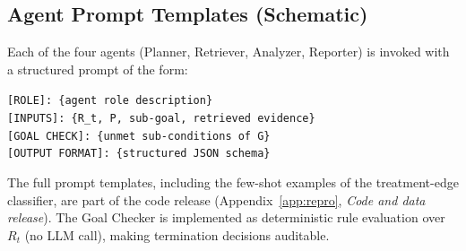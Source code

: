 \begin{table}[h]
\centering
\caption{VIGIL goal-predicate and loop hyperparameters used throughout the evaluation.}
\label{tab:hyperparams}
\small
\setlength{\tabcolsep}{4pt}
\end{table}

\subsection{Agent Prompt Templates (Schematic)}

Each of the four agents (Planner, Retriever, Analyzer, Reporter) is invoked with a structured prompt of the form:
\begin{mycodebox}
\small\texttt{[ROLE]: \{agent role description\}}\\
\texttt{[INPUTS]: \{R\_t, P, sub-goal, retrieved evidence\}}\\
\texttt{[GOAL CHECK]: \{unmet sub-conditions of G\}}\\
\texttt{[OUTPUT FORMAT]: \{structured JSON schema\}}
\end{mycodebox}
The full prompt templates, including the few-shot examples of the treatment-edge classifier, are part of the code release (Appendix~\ref{app:repro}, \emph{Code and data release}). The Goal Checker is implemented as deterministic rule evaluation over $R_t$ (no LLM call), making termination decisions auditable.

